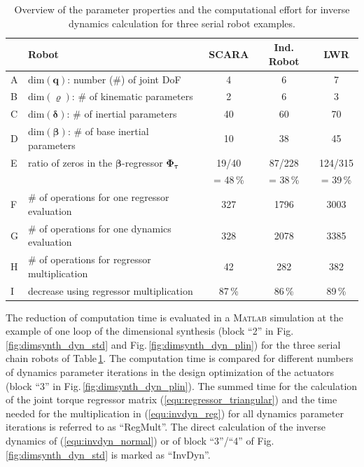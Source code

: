\documentclass{svproc}
\newcommand{\bm}[1]{\boldsymbol{#1}}
\begin{document}
\begin{table}[tb]
    \caption{Overview of the parameter properties and the computational effort for inverse dynamics calculation for three serial robot examples.}
    \label{tab:computation}
    \centering
    \setlength\tabcolsep{3pt}
    \small
    \begin{tabular}[t]{|l||l|c|c|c|} 
        \hline
         & Robot & SCARA & Ind. Robot & LWR \\
        \hline
        A & $\mathrm{dim}(\bm{q})$: number (\#) of joint DoF  & 4 & 6 & 7 \\
        B & $\mathrm{dim}(\bm{\varrho})$: \# of kinematic parameters & 2 & 6 & 3 \\
        C & $\mathrm{dim}(\bm{\delta})$: \# of inertial parameters & 40 & 60 & 70 \\
        D & $\mathrm{dim}(\bm{\beta})$: \# of base inertial parameters  & 10 & 38 & 45 \\ %
        E & ratio of zeros in the $\bm{\beta}$-regressor $\bm{\Phi}_{\bm{\tau}}$ & 19/40 & 87/228  & 124/315 \\
        &  &  = 48\,\% &  = 38\,\% &  = 39\,\% \\
        \hline
        F & \# of operations for one regressor evaluation & 327 & 1796 & 3003 \\
        \hline
        G & \# of operations for one dynamics evaluation & 328 & 2078 & 3385 \\
        H & \# of operations for regressor multiplication & 42 & 282 & 382 \\
        I & decrease using regressor multiplication & 87\,\% & 86\,\% & 89\,\% \\
        \hline
    \end{tabular}
    \vspace{-0.5cm}
\end{table}

The reduction of computation time is evaluated in a \textsc{Matlab} simulation at the example of one loop of the dimensional synthesis (block ``2'' in Fig.\,\ref{fig:dimsynth_dyn_std} and Fig.\,\ref{fig:dimsynth_dyn_plin}) for the three serial chain robots of Table\,\ref{tab:computation}.
The computation time is compared for different numbers of dynamics parameter iterations in the design optimization of the actuators (block ``3'' in Fig.\,\ref{fig:dimsynth_dyn_plin}).
%
The summed time for the calculation of the joint torque regressor matrix (\ref{equ:regressor_triangular}) and the time needed for the multiplication in  (\ref{equ:invdyn_reg}) for all dynamics parameter iterations is referred to as ``RegMult''.
The direct calculation of the inverse dynamics of (\ref{equ:invdyn_normal}) or of block ``3''/``4'' of Fig.\,\ref{fig:dimsynth_dyn_std} is marked as ``InvDyn''.
\end{document}
